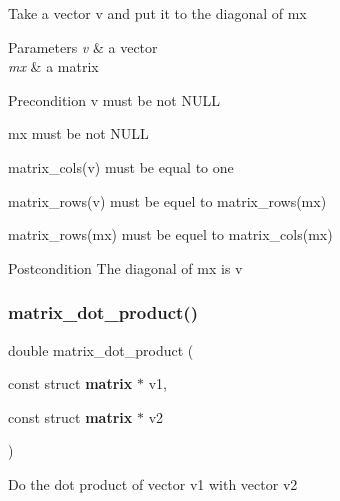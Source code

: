 Take a vector {\ttfamily v} and put it to the diagonal of {\ttfamily mx}


\begin{DoxyParams}{Parameters}
{\em v} & a vector \\
\hline
{\em mx} & a matrix\\
\hline
\end{DoxyParams}
\begin{DoxyPrecond}{Precondition}
{\ttfamily v} must be not N\+U\+LL 

{\ttfamily mx} must be not N\+U\+LL 

{\ttfamily matrix\+\_\+cols(v)} must be equal to one 

{\ttfamily matrix\+\_\+rows(v)} must be equel to {\ttfamily matrix\+\_\+rows(mx)} 

{\ttfamily matrix\+\_\+rows(mx)} must be equel to {\ttfamily matrix\+\_\+cols(mx)}
\end{DoxyPrecond}
\begin{DoxyPostcond}{Postcondition}
The diagonal of {\ttfamily mx} is {\ttfamily v} 
\end{DoxyPostcond}
\mbox{\label{matrix_8h_a7ba7365201acc5889936e1836d14cc8b}} 
\subsubsection{matrix\+\_\+dot\+\_\+product()}
{\footnotesize\ttfamily double matrix\+\_\+dot\+\_\+product (\begin{DoxyParamCaption}\item[{const struct \textbf{ matrix} $\ast$}]{v1,  }\item[{const struct \textbf{ matrix} $\ast$}]{v2 }\end{DoxyParamCaption})}

Do the dot product of vector {\ttfamily v1} with vector {\ttfamily v2}



